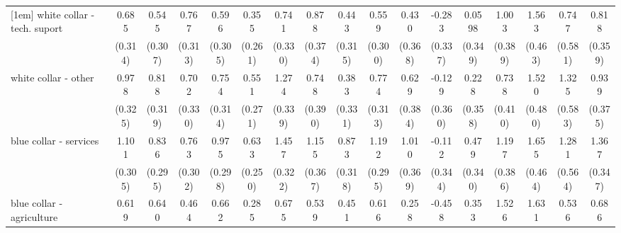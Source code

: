{\begin{tabular}{l*{16}{c}}
[1em]
white collar - tech. suport&       0.685\sym{*}  &       0.545         &       0.767\sym{*}  &       0.596         &       0.355         &       0.741\sym{*}  &       0.878\sym{*}  &       0.443         &       0.559         &       0.430         &      -0.283         &      0.0598         &       1.003\sym{**} &       1.563\sym{***}&       0.747         &       0.818\sym{*}  \\
                    &     (0.314)         &     (0.307)         &     (0.313)         &     (0.305)         &     (0.261)         &     (0.330)         &     (0.374)         &     (0.315)         &     (0.300)         &     (0.368)         &     (0.337)         &     (0.349)         &     (0.389)         &     (0.463)         &     (0.581)         &     (0.359)         \\
[1em]
white collar - other&       0.978\sym{**} &       0.818\sym{*}  &       0.702\sym{*}  &       0.754\sym{*}  &       0.551\sym{*}  &       1.274\sym{***}&       0.748         &       0.383         &       0.774\sym{*}  &       0.629         &      -0.129         &       0.228         &       0.738         &       1.520\sym{**} &       1.325\sym{*}  &       0.939\sym{*}  \\
                    &     (0.325)         &     (0.319)         &     (0.330)         &     (0.314)         &     (0.271)         &     (0.339)         &     (0.390)         &     (0.331)         &     (0.313)         &     (0.384)         &     (0.360)         &     (0.358)         &     (0.410)         &     (0.480)         &     (0.583)         &     (0.375)         \\
[1em]
blue collar - services&       1.101\sym{***}&       0.836\sym{**} &       0.763\sym{*}  &       0.975\sym{**} &       0.633\sym{*}  &       1.457\sym{***}&       1.155\sym{**} &       0.873\sym{**} &       1.192\sym{***}&       1.010\sym{**} &      -0.112         &       0.479         &       1.197\sym{**} &       1.655\sym{***}&       1.281\sym{*}  &       1.367\sym{***}\\
                    &     (0.305)         &     (0.295)         &     (0.302)         &     (0.298)         &     (0.250)         &     (0.322)         &     (0.367)         &     (0.318)         &     (0.295)         &     (0.369)         &     (0.344)         &     (0.340)         &     (0.386)         &     (0.464)         &     (0.564)         &     (0.347)         \\
[1em]
blue collar - agriculture&       0.619         &       0.640         &       0.464         &       0.662         &       0.285         &       0.675         &       0.539         &       0.451         &       0.616         &       0.258         &      -0.458         &       0.353         &       1.526\sym{***}&       1.631\sym{**} &       0.536         &       0.686         \\

\end{tabular}}
